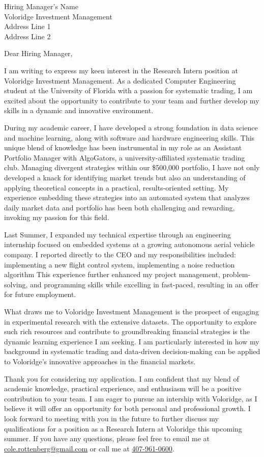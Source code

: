 \documentclass[11pt,a4paper]{letter}
\begin{document}
\begin{letter}{Hiring Manager's Name \\
Voloridge Investment Management \\
Address Line 1 \\
Address Line 2}

\opening{Dear Hiring Manager,}

I am writing to express my keen interest in the Research Intern position at Voloridge Investment Management.
As a dedicated Computer Engineering student at the University of Florida with a passion for systematic trading, I am excited about the opportunity to contribute to your team and further develop my skills in a dynamic and innovative environment.

During my academic career, I have developed a strong foundation in data
science and machine learning, along with software and hardware engineering
skills.
This unique blend of knowledge has been instrumental in my role as an
Assistant Portfolio Manager with AlgoGators, a university-affiliated
systematic trading club.
Managing divergent strategies within our \$500,000 portfolio, I have not
only developed a knack for identifying
market trends but also an understanding of applying theoretical
concepts in a practical, results-oriented setting.
My experience embedding these strategies into an automated system that
analyzes daily market data and portfolio has been both challenging and rewarding,
invoking my passion for this field.

Last Summer, I expanded my technical expertise through an
engineering internship focused on embedded systems at a growing
autonomous aerial vehicle company. I reported directly to the CEO and my
responsibilities included:
implementing a new flight control system, implementing a noise reduction
algorithm
This experience further enhanced my project management, problem-solving,
and programming skills while excelling in fast-paced, resulting in an
offer for future employment.

What draws me to Voloridge Investment Management is the prospect of
engaging in experimental research with the extensive datasets.
The opportunity to explore such rich resources and contribute to
groundbreaking financial strategies is the dynamic learning experience I
am seeking. I am particularly interested in how my background in
systematic trading and data-driven decision-making can be applied to
Voloridge's innovative approaches in the financial markets.

Thank you for considering my application. I am confident that my blend
of academic knowledge, practical experience, and enthusiasm will be a
positive contribution to your team. I am eager to pursue an intership
with Voloridge, as I believe it will offer an opportunity for both
personal and professional growth. I look forward to meeting with you in
the future to further discuss my qualifications for a position as a
Research Intern at Voloridge this upcoming summer. If you have any
questions, please feel free to email me at
\href{mailto:cole.rottenberg@gmail.com}{cole.rottenberg@gmail.com}
or call me at \href{tel:+1-407-961-0600}{407-961-0600}.


\end{letter}
\end{document}
